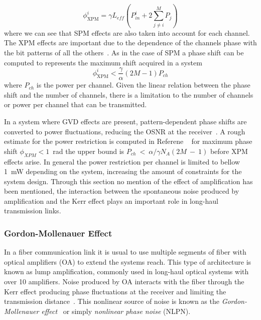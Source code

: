 \begin{equation}
\phi^i_{\text{XPM}}=\gamma L_{eff}\left(P^i_{in}+2\sum^M_{j\ne i}P_j\right)
\end{equation}
where we can see that SPM effects are also taken into account for each channel. The XPM  effects are important due to the dependence of the channels phase with the bit patterns of all the others~\cite{agrawal2001applications}. As in the case of SPM a phase shift can be computed to represents the maximum  shift acquired in a system 
\begin{equation}
\phi^i_{\text{XPM}}<\frac{\gamma}{\alpha}(2M-1)P_{ch}
\end{equation}
where $P_{ch}$ is the power per channel. Given the linear relation between the phase shift and the number of channels, there is a limitation to the number of channels or power per channel that can be transmitted.

 In a system where GVD effects are present, pattern-dependent phase shifts are converted to power fluctuations, reducing the OSNR at the receiver~\cite{agrawal2001applications}.  A rough estimate for the power restriction is computed in Referene ~\cite{le2015advanced} for maximum phase shift $\phi_{XPM}<1$~rad the upper bound is  $P_{ch}~<~\alpha/\gamma N_{A}(2M~-~1)$ before XPM effects arise. In general the power restriction per channel is limited to bellow 1~mW depending on the system, increasing the amount of constraints for the system design. Through this section no mention of the effect of amplification has been mentioned, the interaction between the spontaneous noise produced by amplification and the Kerr effect plays an important role in long-haul transmission links. 


\subsubsection{Gordon-Mollenauer Effect}

In a fiber communication link it is usual to use multiple segments of fiber with optical amplifiers (OA) to extend the systems reach. This type of architecture is known as lump amplification, commonly used in long-haul optical systems with over 10 amplifiers. Noise produced by OA interacts with the fiber through the Kerr effect  producing phase fluctuations at the receiver and limiting the transmission distance~\cite{agrawal2001applications}. This nonlinear source of noise is known as the \textit{Gordon-Mollenauer effect}~\cite{gordon1990phase} or simply \textit{nonlinear phase noise} (NLPN). 

